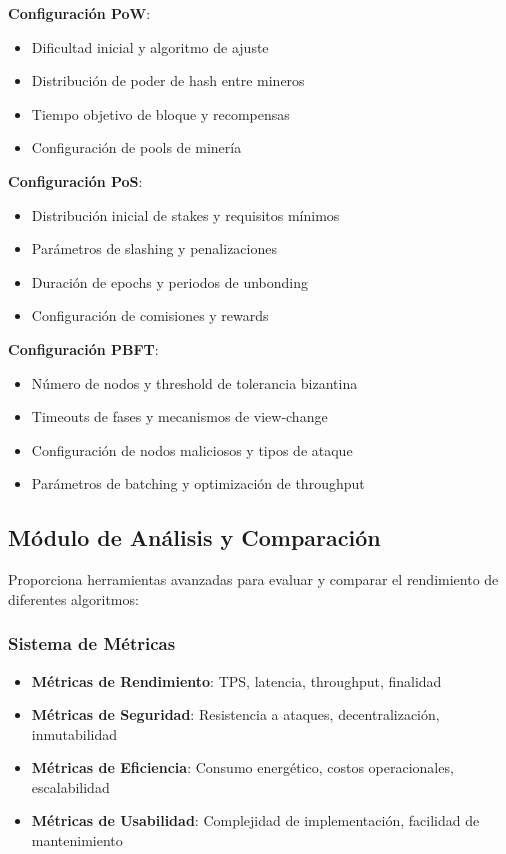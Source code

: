\documentclass[spanish,12pt,letterpaper]{report}
\begin{document}
\textbf{Configuración PoW}:
\begin{itemize}
    \item Dificultad inicial y algoritmo de ajuste
    \item Distribución de poder de hash entre mineros
    \item Tiempo objetivo de bloque y recompensas
    \item Configuración de pools de minería
\end{itemize}

\textbf{Configuración PoS}:
\begin{itemize}
    \item Distribución inicial de stakes y requisitos mínimos
    \item Parámetros de slashing y penalizaciones
    \item Duración de epochs y periodos de unbonding
    \item Configuración de comisiones y rewards
\end{itemize}

\textbf{Configuración PBFT}:
\begin{itemize}
    \item Número de nodos y threshold de tolerancia bizantina
    \item Timeouts de fases y mecanismos de view-change
    \item Configuración de nodos maliciosos y tipos de ataque
    \item Parámetros de batching y optimización de throughput
\end{itemize}

\subsection{Módulo de Análisis y Comparación}

Proporciona herramientas avanzadas para evaluar y comparar el rendimiento de diferentes algoritmos:

\subsubsection{Sistema de Métricas}
\begin{itemize}
    \item \textbf{Métricas de Rendimiento}: TPS, latencia, throughput, finalidad
    \item \textbf{Métricas de Seguridad}: Resistencia a ataques, decentralización, inmutabilidad
    \item \textbf{Métricas de Eficiencia}: Consumo energético, costos operacionales, escalabilidad
    \item \textbf{Métricas de Usabilidad}: Complejidad de implementación, facilidad de mantenimiento
\end{itemize}
\end{document}
